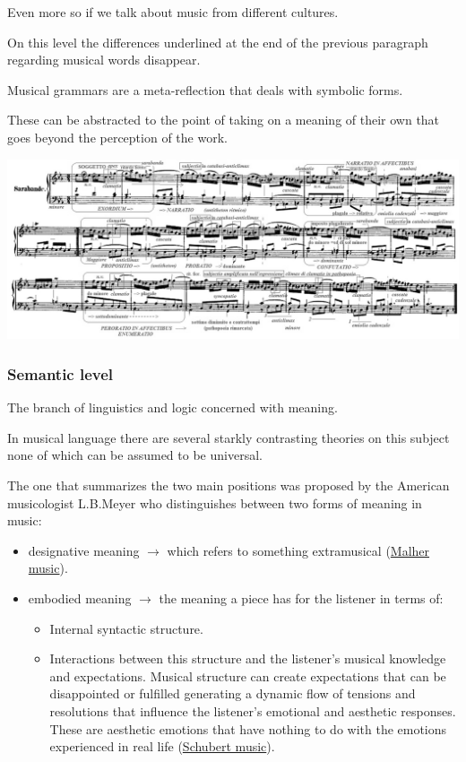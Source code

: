 Even more so if we talk about music from different cultures.

On this level the differences underlined at the end of the previous paragraph regarding musical words disappear.

Musical grammars are a meta-reflection that deals with symbolic forms.

These can be abstracted to the point of taking on a meaning of their own that goes beyond the perception of the work.

\begin{center}
\includegraphics[scale=1.1]{../img/analisische.png}
\end{center}

\subsubsection{Semantic level}\label{semantic-level}

The branch of linguistics and logic concerned with meaning.

In musical language there are several starkly contrasting theories on this subject none of which can be assumed to be universal.

The one that summarizes the two main positions was proposed by the American musicologist L.B.Meyer who distinguishes between two forms of meaning in music:

\begin{itemize}
\tightlist
\item designative meaning \(\rightarrow\) which refers to something extramusical (\href{https://github.com/musicaecodice/EMC/blob/main/1_premises/suoni/Malher.mov}{Malher music}).
\item embodied meaning \(\rightarrow\) the meaning a piece has for the listener in terms of:

  \begin{itemize}
  \tightlist
  \item Internal syntactic structure.
  \item Interactions between this structure and the listener's musical knowledge and expectations. Musical structure can create expectations that can be disappointed or fulfilled generating a dynamic flow of tensions and resolutions that influence the listener's emotional and aesthetic responses. These are aesthetic emotions that have nothing to do with the emotions experienced in real life (\href{https://github.com/musicaecodice/EMC/blob/main/1_premises/suoni/Schubert.mov}{Schubert music}).
  \end{itemize}
\end{itemize}

